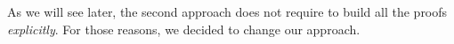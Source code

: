 As we will see later, the second approach does not require to build all the proofs \textit{explicitly}.
For those reasons, we decided to change our approach.






